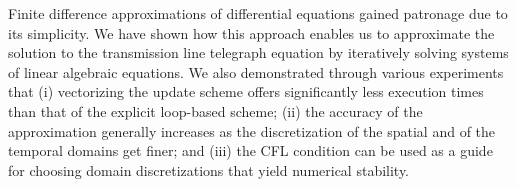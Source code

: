 \documentclass{article}
\begin{document}
Finite difference approximations of differential equations gained patronage due to its simplicity.
We have shown how this approach enables us to approximate the solution to the transmission line telegraph equation
by iteratively solving systems of linear algebraic equations.
We also demonstrated through various experiments that
(i) vectorizing the update scheme offers significantly less execution times than that of the explicit loop-based scheme;
(ii) the accuracy of the approximation generally increases as the discretization of the spatial and of the temporal domains get finer;
and
(iii) the CFL condition can be used as a guide for choosing domain discretizations that yield numerical stability.



\end{document}
